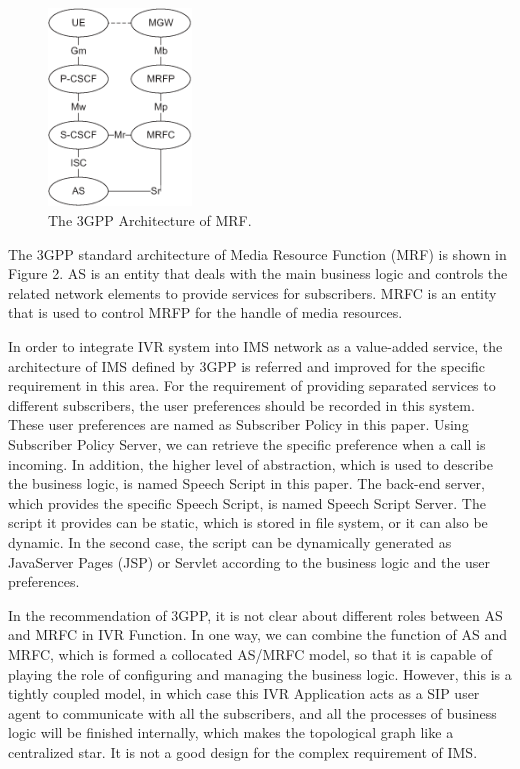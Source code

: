 \documentclass[10pt, conference, a4paper]{IEEEtran}
\begin{document}
\begin{figure}[!t]
\centering
\includegraphics[width=1.5in]{standard.eps}
\caption{The 3GPP Architecture of MRF.}
\end{figure}

The 3GPP standard architecture of Media Resource Function (MRF) is shown in Figure 2. AS is an entity that deals with the main business logic and controls the related network elements to provide services for subscribers. MRFC is an entity that is used to control MRFP for the handle of media resources. 

In order to integrate IVR system into IMS network as a value-added service, the architecture of IMS defined by 3GPP is referred and improved for the specific requirement in this area. For the requirement of providing separated services to different subscribers, the user preferences should be recorded in this system. These user preferences are named as Subscriber Policy in this paper. Using Subscriber Policy Server, we can retrieve the specific preference when a call is incoming. In addition, the higher level of abstraction, which is used to describe the business logic, is named Speech Script in this paper. The back-end server, which provides the specific Speech Script, is named Speech Script Server. The script it provides can be static, which is stored in file system, or it can also be dynamic. In the second case, the script can be dynamically generated as JavaServer Pages (JSP) or Servlet according to the business logic and the user preferences.

In the recommendation of 3GPP, it is not clear about different roles between AS and MRFC in IVR Function. In one way, we can combine the function of AS and MRFC, which is formed a collocated AS/MRFC model, so that it is capable of playing the role of configuring and managing the business logic. However, this is a tightly coupled model, in which case this IVR Application acts as a SIP user agent to communicate with all the subscribers, and all the processes of business logic will be finished internally, which makes the topological graph like a centralized star. It is not a good design for the complex requirement of IMS.
\end{document}
